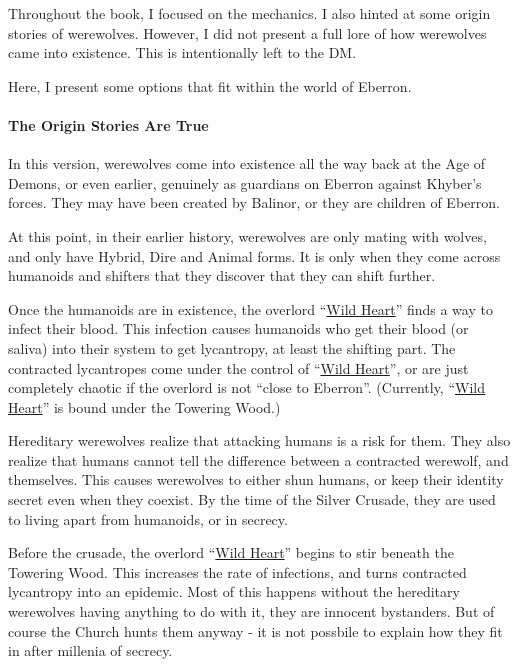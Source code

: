 \documentclass[twocolumn]{dndbook}
\begin{document}
Throughout the book, I focused on the mechanics.
I also hinted at some origin stories of werewolves.
However, I did not present a full lore of how werewolves came into existence.
This is intentionally left to the DM.\par

Here, I present some options that fit within the world of Eberron.\par

\paragraph*{The Origin Stories Are True}

In this version, werewolves come into existence all the way back at the Age of Demons, or even earlier, genuinely as guardians on Eberron against Khyber's forces.
They may have been created by Balinor, or they are children of Eberron.\par

At this point, in their earlier history, werewolves are only mating with wolves, and only have Hybrid, Dire and Animal forms.
It is only when they come across humanoids and shifters that they discover that they can shift further.\par

Once the humanoids are in existence, the overlord ``\href{https://keith-baker.com/2025-lycanthropes/}{Wild Heart}'' finds a way to infect their blood.
This infection causes humanoids who get their blood (or saliva) into their system to get lycantropy, at least the shifting part.
The contracted lycantropes come under the control of ``\href{https://keith-baker.com/2025-lycanthropes/}{Wild Heart}'', or are just completely chaotic if the overlord is not ``close to Eberron''. (Currently, ``\href{https://keith-baker.com/2025-lycanthropes/}{Wild Heart}'' is bound under the Towering Wood.)\par

Hereditary werewolves realize that attacking humans is a risk for them.
They also realize that humans cannot tell the difference between a contracted werewolf, and themselves.
This causes werewolves to either shun humans, or keep their identity secret even when they coexist.
By the time of the Silver Crusade, they are used to living apart from humanoids, or in secrecy.\par

Before the crusade, the overlord ``\href{https://keith-baker.com/2025-lycanthropes/}{Wild Heart}'' begins to stir beneath the Towering Wood.
This increases the rate of infections, and turns contracted lycantropy into an epidemic.
Most of this happens without the hereditary werewolves having anything to do with it, they are innocent bystanders.
But of course the Church hunts them anyway - it is not possbile to explain how they fit in after millenia of secrecy.
\end{document}
